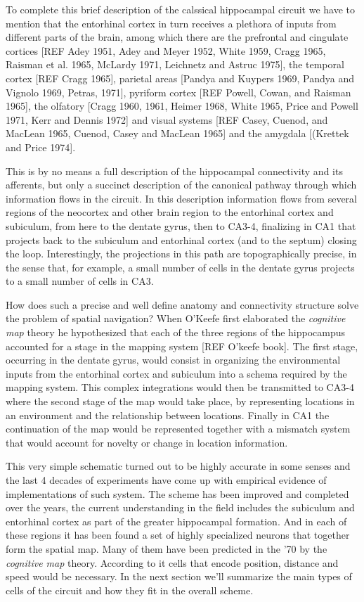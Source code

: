To complete this brief description of the calssical hippocampal circuit we have to mention that the entorhinal cortex in turn receives a plethora of inputs from different parts of the brain, among which there are the prefrontal and cingulate cortices [REF Adey 1951, Adey and Meyer 1952, White 1959, Cragg 1965, Raisman et al. 1965, McLardy 1971, Leichnetz and Astruc 1975], the temporal cortex [REF Cragg 1965], parietal areas [Pandya and Kuypers 1969, Pandya and Vignolo 1969, Petras, 1971], pyriform cortex [REF Powell, Cowan, and Raisman 1965], the olfatory [Cragg 1960, 1961, Heimer 1968, White 1965, Price and Powell 1971, Kerr and Dennis 1972] and visual systems [REF Casey, Cuenod, and MacLean 1965, Cuenod, Casey and MacLean 1965] and the amygdala [(Krettek and Price 1974].

This is by no means a full description of the hippocampal connectivity and its afferents, but only a succinct description of the canonical pathway through which information flows in the circuit. 
In this description information flows from several regions of the neocortex and other brain region to the entorhinal cortex and subiculum, from here to the dentate gyrus, then to CA3-4, finalizing in CA1 that projects back to the subiculum and entorhinal cortex (and to the septum) closing the loop. 
Interestingly, the projections in this path are topographically precise, in the sense that, for example, a small number of cells in the dentate gyrus projects to a small number of cells in CA3.

How does such a precise and well define anatomy and connectivity structure solve the problem of spatial navigation? 
When O'Keefe first elaborated the \textit{cognitive map} theory he hypothesized that each of the three regions of the hippocampus accounted for a stage in the mapping system [REF O'keefe book].
The first stage, occurring in the dentate gyrus, would consist in organizing the environmental inputs from the entorhinal cortex and subiculum into a schema required by the mapping system. 
This complex integrations would then be transmitted to CA3-4 where the second stage of the map would take place, by representing locations in an environment and the relationship between locations.
Finally in CA1 the continuation of the map would be represented together with a mismatch system that would account for novelty or change in location information.

This very simple schematic turned out to be highly accurate in some senses and the last 4 decades of experiments have come up with empirical evidence of implementations of such system. 
The scheme has been improved and completed over the years, the current understanding in the field includes the subiculum and entorhinal cortex as part of the greater hippocampal formation.
And in each of these regions it has been found a set of highly specialized neurons that together form the spatial map. 
Many of them have been predicted in the '70 by the \textit{cognitive map} theory. 
According to it cells that encode position, distance and speed would be necessary.
In the next section we'll summarize the main types of cells of the circuit and how they fit in the overall scheme. 

